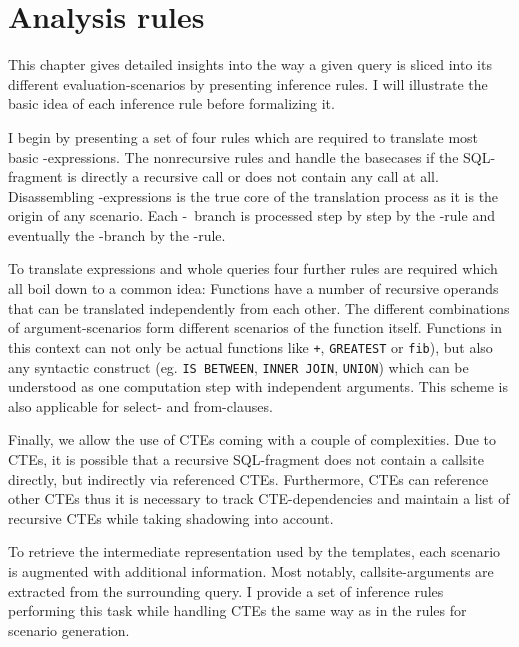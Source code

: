 \chapter{Analysis rules}\label{chapter:analysis}


This chapter gives detailed insights into the way a given query is sliced into its different evaluation-scenarios by presenting inference rules. I will illustrate the basic idea of each inference rule before formalizing it.

I begin by presenting a set of four rules which are required to translate most basic \CASE-expressions. The nonrecursive rules \RREC and \RBASE handle the basecases if the SQL-fragment is directly a recursive call or does not contain any call at all. Disassembling \CASE-expressions is the true core of the translation process as it is the origin of any scenario. Each \WHEN-\THEN~branch is processed step by step by the \RWHEN-rule and eventually the \ELSE-branch by the \RELSE-rule.

To translate expressions and whole queries four further rules are required which all boil down to a common idea: Functions have a number of recursive operands that can be translated independently from each other. The different combinations of argument-scenarios form different scenarios of the function itself. Functions in this context can not only be actual functions like \texttt{+}, \texttt{GREATEST} or \texttt{fib}), but also any syntactic construct (eg. \texttt{IS BETWEEN}, \texttt{INNER JOIN}, \texttt{UNION}) which can be understood as one computation step with independent arguments. This scheme is also applicable for select- and from-clauses.

Finally, we allow the use of CTEs coming with a couple of complexities. Due to CTEs, it is possible that a recursive SQL-fragment does not contain a callsite directly, but indirectly via referenced CTEs. Furthermore, CTEs can reference other CTEs thus it is necessary to track CTE-dependencies and maintain a list of recursive CTEs while taking shadowing into account.

To retrieve the intermediate representation used by the templates, each scenario is augmented with additional information. Most notably, callsite-arguments are extracted from the surrounding query. I provide a set of inference rules performing this task while handling CTEs the same way as in the rules for scenario generation.

